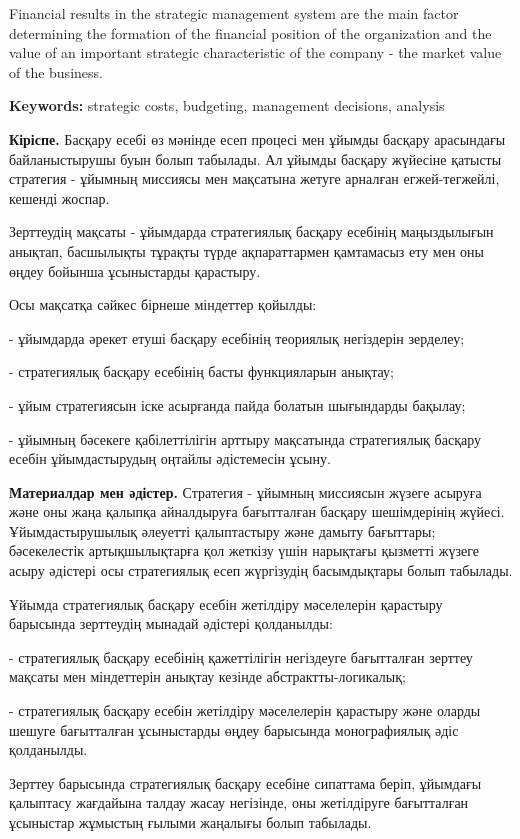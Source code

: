 Financial results in the strategic management system are the main factor
determining the formation of the financial position of the organization
and the value of an important strategic characteristic of the company -
the market value of the business.

{\bfseries Keywords:} strategic costs, budgeting, management decisions,
analysis

\begin{multicols}{2}
{\bfseries Кіріспе.} Басқару есебі өз мәнінде есеп процесі мен ұйымды
басқару арасындағы байланыстырушы буын болып табылады. Ал ұйымды басқару
жүйесіне қатысты стратегия - ұйымның миссиясы мен мақсатына жетуге
арналған егжей-тегжейлі, кешенді жоспар.

Зерттеудің мақсаты - ұйымдарда стратегиялық басқару есебінің
маңыздылығын анықтап, басшылықты тұрақты түрде ақпараттармен қамтамасыз
ету мен оны өңдеу бойынша ұсыныстарды қарастыру.

Осы мақсатқа сәйкес бірнеше міндеттер қойылды:

- ұйымдарда әрекет етуші басқару есебінің теориялық негіздерін зерделеу;

- стратегиялық басқару есебінің басты функцияларын анықтау;

- ұйым стратегиясын іске асырғанда пайда болатын шығындарды бақылау;

- ұйымның бәсекеге қабілеттілігін арттыру мақсатында стратегиялық басқару
есебін ұйымдастырудың оңтайлы әдістемесін ұсыну.

{\bfseries Материалдар мен әдістер.} Стратегия - ұйымның миссиясын жүзеге
асыруға және оны жаңа қалыпқа айналдыруға бағытталған басқару
шешімдерінің жүйесі. Ұйымдастырушылық әлеуетті қалыптастыру және дамыту
бағыттары; бәсекелестік артықшылықтарға қол жеткізу үшін нарықтағы
қызметті жүзеге асыру әдістері осы стратегиялық есеп жүргізудің
басымдықтары болып табылады.

Ұйымда стратегиялық басқару есебін жетілдіру мәселелерін қарастыру
барысында зерттеудің мынадай әдістері қолданылды:

- стратегиялық басқару есебінің қажеттілігін негіздеуге бағытталған
зерттеу мақсаты мен міндеттерін анықтау кезінде абстрактты-логикалық;

- стратегиялық басқару есебін жетілдіру мәселелерін қарастыру және
оларды шешуге бағытталған ұсыныстарды өңдеу барысында монографиялық
әдіс қолданылды.

Зерттеу барысында стратегиялық басқару есебіне сипаттама беріп, ұйымдағы
қалыптасу жағдайына талдау жасау негізінде, оны жетілдіруге бағытталған
ұсыныстар жұмыстың ғылыми жаңалығы болып табылады.


\end{multicols}
